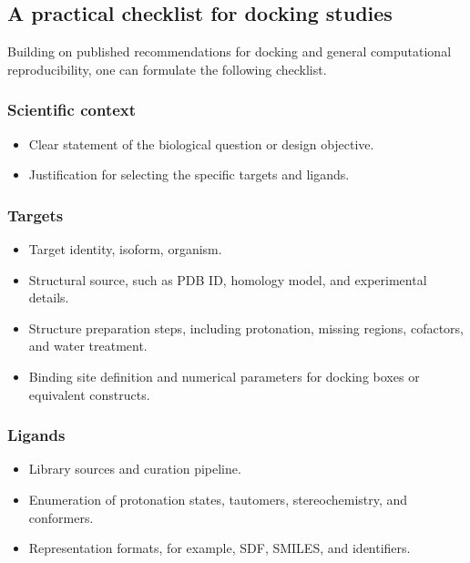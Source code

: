 \documentclass[12pt]{article}
\begin{document}
\subsection{A practical checklist for docking studies}

Building on published recommendations for docking and general computational reproducibility, one can formulate the following checklist.\cite{CH12_plos2025tenDocking}

\subsubsection*{Scientific context}

\begin{itemize}
  \item Clear statement of the biological question or design objective.
  \item Justification for selecting the specific targets and ligands.
\end{itemize}

\subsubsection*{Targets}

\begin{itemize}
  \item Target identity, isoform, organism.
  \item Structural source, such as PDB ID, homology model, and experimental details.
  \item Structure preparation steps, including protonation, missing regions, cofactors, and water treatment.
  \item Binding site definition and numerical parameters for docking boxes or equivalent constructs.
\end{itemize}

\subsubsection*{Ligands}

\begin{itemize}
  \item Library sources and curation pipeline.
  \item Enumeration of protonation states, tautomers, stereochemistry, and conformers.
  \item Representation formats, for example, SDF, SMILES, and identifiers.
\end{itemize}
\end{document}
